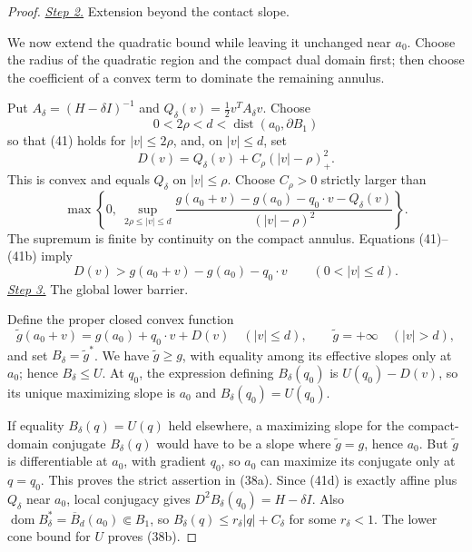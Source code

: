 \documentclass{smfart}
\theoremstyle{definition}
\newcommand{\1}{\mathbf 1}
\begin{document}
\begin{proof}
\smallskip\noindent
\underline{\textit{Step 2.}} Extension beyond the contact slope.

We now extend the quadratic bound while leaving it unchanged near
$a_0$.  Choose the radius of the quadratic region and the compact
dual domain first; then choose the coefficient of a convex term to
dominate the remaining annulus.

Put $A_ \delta=(H-\delta I)^{-1}$ and
$Q_ \delta(v)=\frac12v^TA_ \delta v$.  Choose
\begin{equation*}
0<2\rho<d<\operatorname {dist}(a_ 0,\partial B_ 1)
\end{equation*}
so that (41) holds for $|v|\leq2\rho$, and, on $|v|\leq d$, set
\begin{equation}
D(v)=Q_ \delta(v)+C_ \rho(|v|-\rho)_ +^2.
\tag{41a}
\end{equation}
This is convex and equals $Q_ \delta$ on $|v|\leq\rho$.  Choose
$C_ \rho>0$ strictly larger than
\begin{equation}
\max\!\left\{0,\
\sup_ {2\rho\leq|v|\leq d}
\frac{g(a_ 0+v)-g(a_ 0)-q_ 0\cdot v-Q_ \delta(v)}
{(|v|-\rho)^2}\right\}.
\tag{41b}
\end{equation}
The supremum is finite by continuity on the compact annulus.
Equations (41)--(41b) imply
\begin{equation}
D(v)>g(a_ 0+v)-g(a_ 0)-q_ 0\cdot v
\qquad(0<|v|\leq d).
\tag{41c}
\end{equation}
\smallskip\noindent
\underline{\textit{Step 3.}} The global lower barrier.

Define the proper closed convex function
\begin{equation}
\widetilde g(a_ 0+v)=g(a_ 0)+q_ 0\cdot v+D(v)
\quad(|v|\leq d),\qquad
\widetilde g=+\infty\quad(|v|>d),
\tag{41d}
\end{equation}
and set $B_ \delta=\widetilde g^*$.  We have
$\widetilde g\geq g$, with equality among its effective slopes only
at $a_ 0$; hence $B_ \delta\leq U$.  At $q_ 0$, the expression
defining $B_ \delta(q_ 0)$ is $U(q_ 0)-D(v)$, so its unique maximizing
slope is $a_ 0$ and $B_ \delta(q_ 0)=U(q_ 0)$.

If equality $B_ \delta(q)=U(q)$ held elsewhere, a maximizing slope
for the compact-domain conjugate $B_ \delta(q)$ would have to be a
slope where $\widetilde g=g$, hence $a_ 0$.  But
$\widetilde g$ is differentiable at $a_ 0$, with gradient $q_ 0$,
so $a_ 0$ can maximize its conjugate only at $q=q_ 0$.  This proves
the strict assertion in (38a).  Since (41d) is exactly affine plus
$Q_ \delta$ near $a_ 0$, local conjugacy gives
$D^2B_ \delta(q_ 0)=H-\delta I$.  Also
$\operatorname {dom}B_ \delta^*=\overline B_ d(a_ 0)\Subset B_ 1$,
so $B_ \delta(q)\leq r_ \delta|q|+C_ \delta$ for some
$r_ \delta<1$.  The lower cone bound for $U$ proves (38b).


\end{proof}
\end{document}
